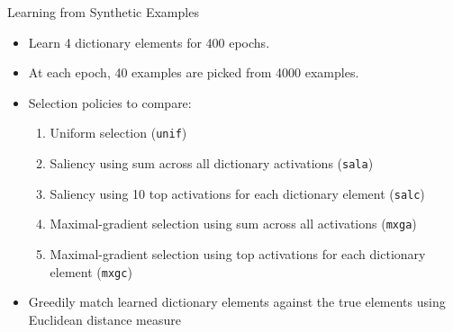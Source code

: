 \documentclass{beamer}
\begin{document}
\begin{frame}{Learning from Synthetic Examples}

\begin{itemize}
	\item Learn 4 dictionary elements for 400 epochs.
	\item At each epoch, 40 examples are picked from 4000 examples.
	\item Selection policies to compare:
\begin{enumerate}
	\item Uniform selection ({\tt unif})
	\item Saliency using sum across all dictionary activations ({\tt sala})
	\item Saliency using 10 top activations for each dictionary element ({\tt salc})
	\item Maximal-gradient selection using sum across all activations ({\tt mxga})
	\item Maximal-gradient selection using top activations for each dictionary element ({\tt mxgc}) 
\end{enumerate}

	\item Greedily match learned dictionary elements against the true elements using Euclidean distance measure
\end{itemize}

\end{frame}
\end{document}

